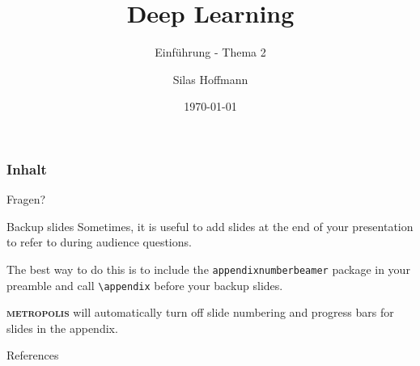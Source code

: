 \documentclass[10pt]{beamer}
\title{Deep Learning}
\subtitle{Einführung - Thema 2}
\date{\today}
\author{Silas Hoffmann}
\institute{Fachhochschule Wedel}
\newcommand{\themename}{\textbf{\textsc{metropolis}}\xspace}
\begin{document}
\maketitle

\begin{frame}
\frametitle{Inhalt}
\tableofcontents
\end{frame}




\maketitle

\begin{frame}[standout]
Fragen?
\end{frame}

\appendix

\begin{frame}[fragile]{Backup slides}
  Sometimes, it is useful to add slides at the end of your presentation to
  refer to during audience questions.

  The best way to do this is to include the \verb|appendixnumberbeamer|
  package in your preamble and call \verb|\appendix| before your backup slides.

  \themename will automatically turn off slide numbering and progress bars for
  slides in the appendix.
\end{frame}

\begin{frame}[allowframebreaks]{References}
  \nocite{*} 
  
  
\end{frame}
\end{document}
